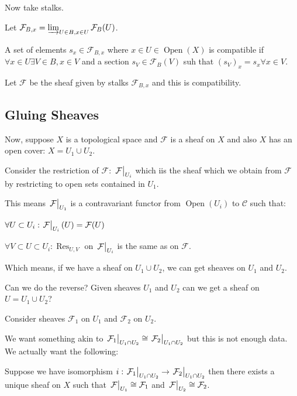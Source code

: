 \documentclass{article}
\theoremstyle{definition}
\begin{document}
    Now take stalks.

    Let \(\mathcal{F}_{B,x} = \varinjlim_{U\in B, x\in U} \mathcal{F} _B (U)\).

    A set of elements \(s_x\in \mathcal{F}_{B,x}\) where \(x\in U \in \operatorname{Open} (X)   \) is compatible if \(\forall x\in U \exists V\in B, x\in V\) and a section \(s_V \in \mathcal{F}_B (V)\) suh that \((s_V)_x = s_x \forall x\in V\).
    
    Let \(\mathcal{F}\) be the sheaf given by stalks \(\mathcal{F}_{B,x}\) and this is compatibility.

    \subsection*{Gluing Sheaves}

    Now, suppose \(X\) is a topological space and \(\mathcal{F}\) is a sheaf on \(X\) and also \(X\) has an open cover: \(X = U_1 \cup U_2\).

    Consider the restriction of \(\mathcal{F}\): \(\eval{\mathcal{F}}_{U_i}\) which iis the sheaf which we obtain from \(\mathcal{F}\) by restricting to open sets contained in \(U_1\).

    This means \(\eval{\mathcal{F}}_{U_1}\) is a contravariant functor from \(\operatorname{Open}(U_i)\) to \(\mathcal{C}\) such that:

    \(\forall U \subset U_i: \eval{\mathcal{F}}_{U_i}(U) = \mathcal{F}(U)\)

    \(\forall V \subset U \subset U_i: \operatorname{Res}_{U, V}\) on \(\eval{\mathcal{F}}_{U_i}\) is the same as on \(\mathcal{F}\).

    Which means, if we have a sheaf on \(U_1\cup U_2\), we can get sheaves on \(U_1\) and \(U_2\).

    Can we do the reverse? Given sheaves \(U_1\) and \(U_2\) can we get a sheaf on \(U = U_1\cup U_2\)?

    Consider sheaves \(\mathcal{F}_1\) on \(U_1\) and \(\mathcal{F}_2\) on \(U_2\).

    We want something akin to \(\eval{\mathcal{F}_1}_{U_1\cap U_2} \cong \eval{\mathcal{F}_2}_{U_1\cap U_2}\) but this is not enough data. We actually want the following:

    Suppose we have isomorphism \(i: \eval{\mathcal{F}_1}_{U_1 \cap U_2} \to \eval{\mathcal{F}_2}_{U_1\cap U_2}\) then there exists a unique sheaf on \(X\) such that \(\eval{\mathcal{F}}_{U_1} \cong \mathcal{F}_1\) and \(\eval{\mathcal{F}}_{U_2} \cong \mathcal{F}_2\).
    
\end{document}
